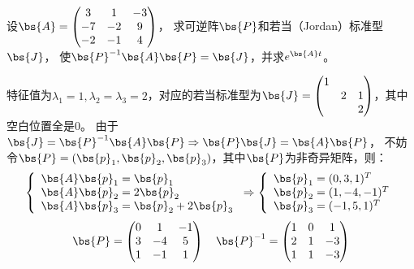 \documentclass[12pt, a4paper, oneside, UTF8]{ctexbook}
\begin{document}
\begin{question}
    设$\bs{A}=\begin{pmatrix}
        3&1&-3\\
        -7&-2&9\\
        -2&-1&4
    \end{pmatrix}$，
    求可逆阵$\bs{P}$和若当（Jordan）标准型$\bs{J}$，
    使$\bs{P}^{-1}\bs{A}\bs{P}=\bs{J}$，并求$e^{\bs{A}t}$。
\end{question}

\begin{solution}
    特征值为$\lambda_1=1,\lambda_2=\lambda_3=2$，对应的若当标准型为$\bs{J}=\begin{pmatrix}
        1 & & \\
        & 2& 1\\
        & & 2
    \end{pmatrix}$，其中空白位置全是$0$。
    由于$\bs{J}=\bs{P}^{-1}\bs{A}\bs{P} \Rightarrow \bs{P}\bs{J}=\bs{A}\bs{P}$，
    不妨令$\bs{P}=(\bs{p}_1,\bs{p}_2,\bs{p}_3)$，其中$\bs{P}$为非奇异矩阵，则：
    \begin{align*}
        \left\{
            \begin{array}{ll}
                \bs{A}\bs{p}_1=\bs{p}_1 \\
                \bs{A}\bs{p}_2=2\bs{p}_2 \\
                \bs{A}\bs{p}_3=\bs{p}_2+2\bs{p}_3
            \end{array} 
            \right.
            \Rightarrow
            \left\{
            \begin{array}{ll}
                \bs{p}_1=(0,3,1)^T \\
                \bs{p}_2=(1,-4,-1)^T \\
                \bs{p}_3=(-1,5,1)^T
            \end{array} 
            \right.
    \end{align*}
    \begin{align*}
        \bs{P}=\begin{pmatrix}
            0 & 1 &-1 \\
            3 & -4 &5 \\
            1 & -1 &1
        \end{pmatrix} \quad
        \bs{P}^{-1}=\begin{pmatrix}
            1	&0	&1 \\
            2	&1	&-3\\
            1	&1	&-3  
        \end{pmatrix}

\end{align*}
\end{solution}
\end{document}
